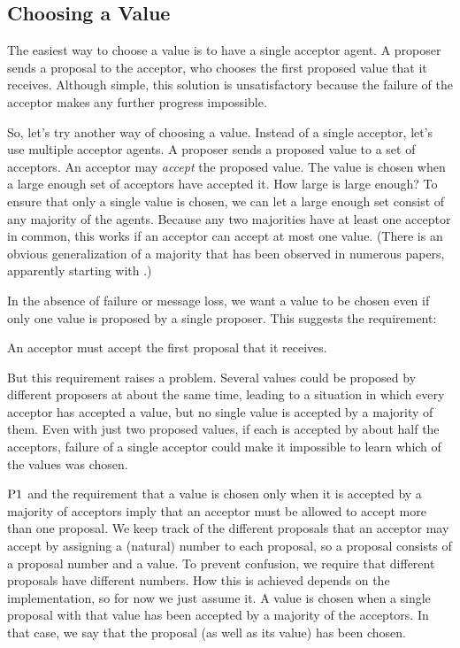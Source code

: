 \subsection{Choosing a Value}
The easiest way to choose a value is to have a single acceptor agent.
A proposer sends a proposal to the acceptor, who chooses the first proposed value
that it receives.
Although simple, this solution is unsatisfactory because the
failure of the acceptor makes any further progress impossible.

So, let's try another way of choosing a value.
Instead of a single acceptor, let's use multiple acceptor agents.
A proposer sends a proposed value to a set of acceptors.
An acceptor may \emph{accept} the proposed value.
The value is chosen when a large enough set of acceptors have accepted it.
How large is large enough?
To ensure that only a single value is chosen, we can let a large enough set consist of any majority of the agents.
Because any two majorities have at least one acceptor in common, this works if an acceptor can accept at most one value.
(There is an obvious generalization of a majority that has been observed in numerous papers, apparently starting with \cite{Lamport78}.)

In the absence of failure or message loss, we want a value to be chosen even if only one value is proposed by a single proposer.
This suggests the requirement:

\begin{paxostheoremenv}[$\PaxosTheorem{1}$]
    An acceptor must accept the first proposal that it receives.
\end{paxostheoremenv}

But this requirement raises a problem.
Several values could be proposed by different proposers at about the same time, leading to a situation in which every acceptor has accepted a value, but no single value is accepted by a majority of them.
Even with just two proposed values, if each is accepted by about half the acceptors, failure of a single acceptor could make it impossible to learn which of the values was chosen.

$\PaxosTheorem{1}$ and the requirement that a value is chosen only when it is accepted by a majority of acceptors imply that an acceptor must be allowed to accept more than one proposal.
We keep track of the different proposals that an acceptor may accept by assigning a (natural) number to each proposal, so a proposal consists of a proposal number and a value.
To prevent confusion, we require that different proposals have different numbers.
How this is achieved depends on the implementation, so for now we just assume it.
A value is chosen when a single proposal with that value has been accepted by a majority of the acceptors.
In that case, we say that the proposal (as well as its value) has been chosen.

